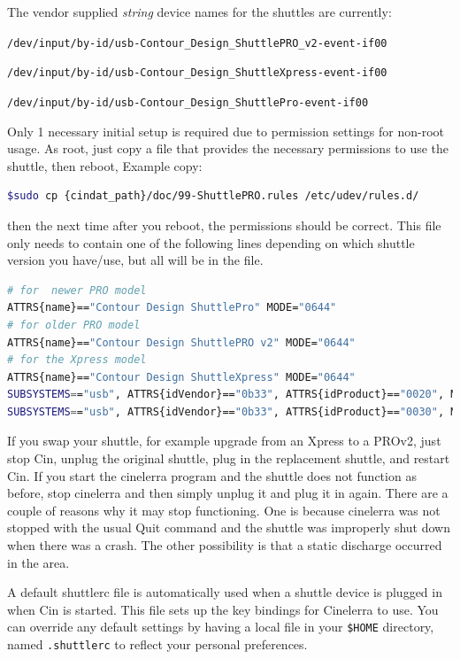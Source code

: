 \noindent The vendor supplied \textit{string} device names for the shuttles are currently:

{\small
\vspace{1ex} \texttt{/dev/input/by-id/usb-Contour\_Design\_ShuttlePRO\_v2-event-if00}
 
 \texttt{/dev/input/by-id/usb-Contour\_Design\_ShuttleXpress-event-if00}
 
 \texttt{/dev/input/by-id/usb-Contour\_Design\_ShuttlePro-event-if00}
 }

\vspace{1ex}
\noindent Only 1 necessary initial setup is required due to permission settings for non-root usage. As root, just copy a file that provides the necessary permissions to use the shuttle, then reboot,  Example copy:

\begin{lstlisting}[language=Bash]
$sudo cp {cindat_path}/doc/99-ShuttlePRO.rules /etc/udev/rules.d/
\end{lstlisting}

\noindent then the next time after you reboot, the permissions should be correct. This file only needs to contain one of the following lines depending on which shuttle version you have/use, but all will be in the file.
\begin{lstlisting}[language=Bash,basicstyle=\footnotesize]
# for  newer PRO model 
ATTRS{name}=="Contour Design ShuttlePro" MODE="0644"		
# for older PRO model 
ATTRS{name}=="Contour Design ShuttlePRO v2" MODE="0644"	
# for the Xpress model 
ATTRS{name}=="Contour Design ShuttleXpress" MODE="0644"	
SUBSYSTEMS=="usb", ATTRS{idVendor}=="0b33", ATTRS{idProduct}=="0020", MODE="0666" 
SUBSYSTEMS=="usb", ATTRS{idVendor}=="0b33", ATTRS{idProduct}=="0030", MODE="0666"
\end{lstlisting}
If you swap your shuttle, for example upgrade from an Xpress to a PROv2, just stop Cin, unplug the original shuttle, plug in the replacement shuttle, and restart Cin.  If you start the cinelerra program and the shuttle does not function as before, stop cinelerra and then simply unplug it and plug it in again.  There are a couple of reasons why it may stop functioning.  One is because cinelerra was not stopped with the usual Quit command and the shuttle was improperly shut down when there was a crash.  The other possibility is that a static discharge occurred in the area.

A default shuttlerc file is automatically used when a shuttle device is plugged in when Cin is started. This file sets up the key bindings for Cinelerra to use. You can override any default settings by having a local file in your \texttt{\$HOME} directory, named \texttt{.shuttlerc} to reflect your personal preferences.

